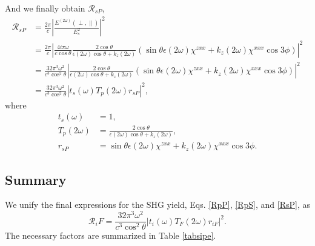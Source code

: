 And we finally obtain $\mathcal{R}_{sP}$,
\begin{align}
\mathcal{R}_{sP}
&= \frac{2\pi}{c}
   \left\vert\frac{E^{(2\omega)}(\perp,\parallel)}{E^{2}_{s}}\right\vert^{2}
   \nonumber\\
&= \frac{2\pi}{c}
   \left\vert
   \frac{4i\pi\omega}{c\cos\theta}
   \frac{2\cos\theta}{\epsilon(2\omega)\cos\theta + k_{z}(2\omega)}
   (\sin\theta\epsilon(2\omega)\chi^{zxx} + k_{z}(2\omega)\chi^{xxx}\cos3\phi)
   \right\vert^{2}\nonumber\\
&= \frac{32\pi^{3}\omega^{2}}{c^{3}\cos^{2}\theta}
   \left\vert
   \frac{2\cos\theta}{\epsilon(2\omega)\cos\theta + k_{z}(2\omega)}
   (\sin\theta\epsilon(2\omega)\chi^{zxx} + k_{z}(2\omega)\chi^{xxx}\cos3\phi)
   \right\vert^{2}\nonumber\\
&= \frac{32\pi^{3}\omega^{2}}{c^{3}\cos^{2}\theta}
   \left\vert t_{s}(\omega)T_{p}(2\omega)r_{sP}\right\vert^{2},
   \label{RsP}
\end{align}
where
\begin{equation*}
\begin{split}
t_{s}(\omega)
&= 1,\\
T_{p}(2\omega)
&= \frac{2\cos\theta}{\epsilon(2\omega)\cos\theta + k_{z}(2\omega)},\\
r_{sP} &=
\sin\theta\epsilon(2\omega)\chi^{zxx} + k_{z}(2\omega)\chi^{xxx}\cos3\phi.
\end{split}
\end{equation*}


\subsection{Summary}

We unify the final expressions for the SHG yield, Eqs. \eqref{RpP},
\eqref{RpS}, and \eqref{RsP}, as
\begin{equation}\label{Rsipe}
\mathcal{R}_iF = \frac{32\pi^{3}\omega^{2}}{c^{3}\cos^{2}\theta}
\left\vert t_{i}(\omega)T_{F}(2\omega)r_{iF}\right\vert^{2}.
\end{equation}
The necessary factors are summarized in Table \ref{tabsipe}.

